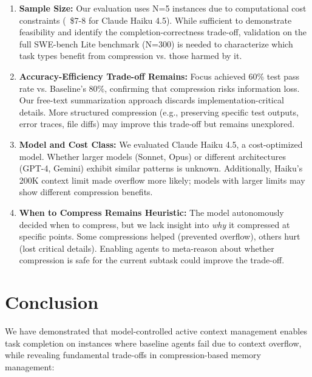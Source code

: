\documentclass[conference]{IEEEtran}
\begin{document}
\begin{enumerate}
    \item \textbf{Sample Size:} Our evaluation uses N=5 instances due to computational cost constraints (~\$7-8 for Claude Haiku 4.5). While sufficient to demonstrate feasibility and identify the completion-correctness trade-off, validation on the full SWE-bench Lite benchmark (N=300) is needed to characterize which task types benefit from compression vs. those harmed by it.
    
    \item \textbf{Accuracy-Efficiency Trade-off Remains:} Focus achieved 60\% test pass rate vs. Baseline's 80\%, confirming that compression risks information loss. Our free-text summarization approach discards implementation-critical details. More structured compression (e.g., preserving specific test outputs, error traces, file diffs) may improve this trade-off but remains unexplored.
    
    \item \textbf{Model and Cost Class:} We evaluated Claude Haiku 4.5, a cost-optimized model. Whether larger models (Sonnet, Opus) or different architectures (GPT-4, Gemini) exhibit similar patterns is unknown. Additionally, Haiku's 200K context limit made overflow more likely; models with larger limits may show different compression benefits.
    
    \item \textbf{When to Compress Remains Heuristic:} The model autonomously decided when to compress, but we lack insight into \textit{why} it compressed at specific points. Some compressions helped (prevented overflow), others hurt (lost critical details). Enabling agents to meta-reason about whether compression is safe for the current subtask could improve the trade-off.
\end{enumerate}

\section{Conclusion}
We have demonstrated that model-controlled active context management enables task completion on instances where baseline agents fail due to context overflow, while revealing fundamental trade-offs in compression-based memory management:
\end{document}
